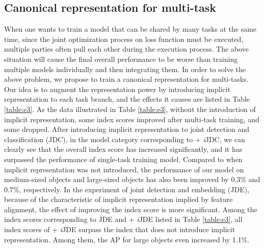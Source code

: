 \documentclass[10pt,twocolumn,letterpaper]{article}
\begin{document}
\newpage

\subsection{Canonical representation for multi-task}
\label{sec:mt}

When one wants to train a model that can be shared by many tasks at the same time, since the joint optimization process on loss function must be executed, multiple parties often pull each other during the execution process. The above situation will cause the final overall performance to be worse than training multiple models individually and then integrating them. In order to solve the above problem, we propose to train a canonical representation for multi-tasks. Our idea is to augment the representation power by introducing implicit representation to each task branch, and the effects it causes are listed in Table \ref{table:e3}. As the data illustrated in Table \ref{table:e3}, without the introduction of implicit representation, some index scores improved after multi-task training, and some dropped. After introducing implicit representation to joint detection and classification (JDC), in the model category corresponding to + \textit{i}JDC, we can clearly see that the overall index score has increased significantly, and it has surpassed the performance of single-task training model. Compared to when implicit representation was not introduced, the performance of our model on medium-sized objects and large-sized objects has also been improved by 0.3\% and 0.7\%, respectively. In the experiment of joint detection and embedding (JDE), because of the characteristic of implicit representation implied by feature alignment, the effect of improving the index score is more significant. Among the index scores corresponding to JDE and + \textit{i}JDE listed in Table \ref{table:e3}, all index scores of + \textit{i}JDE surpass the index that does not introduce implicit representation. Among them, the AP for large objects even increased by 1.1\%.
\end{document}
